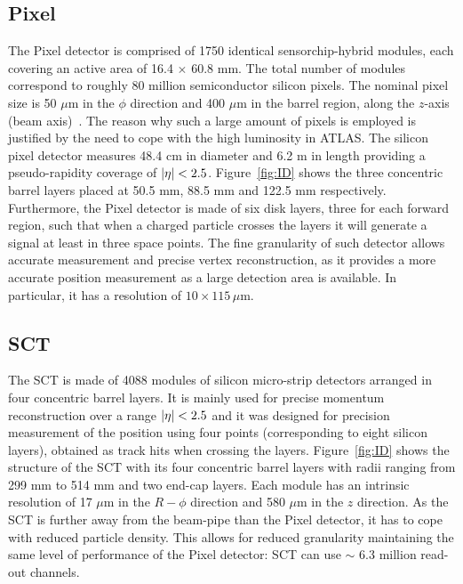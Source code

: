 			\subsection*{Pixel}
				
				The Pixel detector is comprised of 1750 identical sensorchip-hybrid modules, each covering an active area of 16.4 $\times$ 60.8 mm. The total number of modules correspond to roughly 80 million semiconductor silicon pixels. The nominal pixel size is 50 $\mu$m in the $\phi$ direction and 400 $\mu$m in the barrel region, along the $z$-axis (beam axis)~\cite{ATLASPix}. The reason why such a large amount of pixels is employed is justified by the need to cope with the high luminosity in \ac{ATLAS}. The silicon pixel detector measures 48.4 cm in diameter and 6.2 m in length providing a pseudo-rapidity coverage of $|\eta| < 2.5$. Figure~\ref{fig:ID} shows the three concentric barrel layers placed at 50.5 mm, 88.5 mm and 122.5 mm respectively. Furthermore, the Pixel detector is made of six disk layers, three for each forward region, such that when a charged particle crosses the layers it will generate a signal at least in three space points. The fine granularity of such detector allows accurate measurement and precise vertex reconstruction, as it provides a more accurate position measurement as a large detection area is available. In particular, it has a resolution of $10 \times 115\,\mu$m.

			\subsection*{SCT}

				The \ac{SCT} is made of 4088 modules of silicon micro-strip detectors arranged in four concentric barrel layers. It is mainly used for precise momentum reconstruction over a range $|\eta| < 2.5$ and it was designed for precision measurement of the position using four points (corresponding to eight silicon layers), obtained as track hits when crossing the layers. Figure~\ref{fig:ID} shows the structure of the \ac{SCT} with its four concentric barrel layers with radii ranging from 299 mm to 514 mm and two end-cap layers. Each module has an intrinsic resolution of 17 $\mu$m in the $R-\phi$ direction and 580 $\mu$m in the $z$ direction. As the \ac{SCT} is further away from the beam-pipe than the Pixel detector, it has to cope with reduced particle density. This allows for reduced granularity maintaining the same level of performance of the Pixel detector: \ac{SCT} can use $\sim$ 6.3 million read-out channels.%


